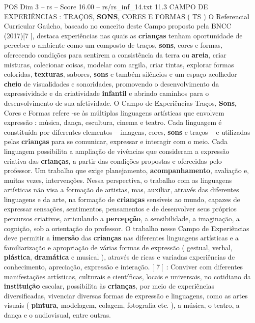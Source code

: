 \begin{textsample}{POS Dim 3 – rs – Score 16.00 – rs/rs\_inf\_14.txt}  \label{ex:f3_pos_248}
11.3 CAMPO DE EXPERIÊNCIAS : TRAÇOS, \textbf{SONS}, CORES E FORMAS ( TS ) O Referencial Curricular Gaúcho, baseado no conceito deste Campo proposto pela BNCC (2017)[7 ], destaca experiências nas quais as \textbf{crianças} tenham oportunidade de perceber o ambiente como um composto de traços, \textbf{sons}, cores e formas, oferecendo condições para sentirem a consistência da terra ou \textbf{areia}, criar misturas, colecionar coisas, modelar com argila, criar tintas, explorar formas coloridas, \textbf{texturas}, sabores, \textbf{sons} e também silêncios e um espaço acolhedor \textbf{cheio} de visualidades e sonoridades, promovendo o desenvolvimento da expressividade e da criatividade \textbf{infantil} e abrindo caminhos para o desenvolvimento de sua afetividade.
O Campo de Experiências Traços, \textbf{Sons}, Cores e Formas refere -se às múltiplas linguagens artísticas que envolvem expressão : música, dança, escultura, cinema e teatro.
Cada linguagem é constituída por diferentes elementos – imagens, cores, \textbf{sons} e traços – e utilizadas pelas \textbf{crianças} para se comunicar, expressar e interagir com o meio.
Cada linguagem possibilita a ampliação de vivências que consideram a expressão criativa das \textbf{crianças}, a partir das condições propostas e oferecidas pelo professor.
Um trabalho que exige planejamento, \textbf{acompanhamento}, avaliação e, muitas vezes, intervenções.
Nessa perspectiva, o trabalho com as linguagens artísticas não visa a formação de artistas, mas, auxiliar, através das diferentes linguagens e da arte, na formação de \textbf{crianças} sensíveis ao mundo, capazes de expressar sensações, sentimentos, pensamentos e de desenvolver seus próprios percursos criativos, articulando a \textbf{percepção}, a sensibilidade, a imaginação, a cognição, sob a orientação do professor.
O trabalho nesse Campo de Experiências deve permitir a \textbf{imersão} das \textbf{crianças} nas diferentes linguagens artísticas e a familiarização e apropriação de várias formas de expressão ( gestual, verbal, \textbf{plástica}, \textbf{dramática} e musical ), através de ricas e variadas experiências de conhecimento, apreciação, expressão e interação. [ 7 ] : Conviver com diferentes manifestações artísticas, culturais e científicas, locais e universais, no cotidiano da \textbf{instituição} escolar, possibilita às \textbf{crianças}, por meio de experiências diversificadas, vivenciar diversas formas de expressão e linguagens, como as artes visuais ( \textbf{pintura}, modelagem, colagem, fotografia etc. ), a música, o teatro, a dança e o audiovisual, entre outras.

\end{textsample}
